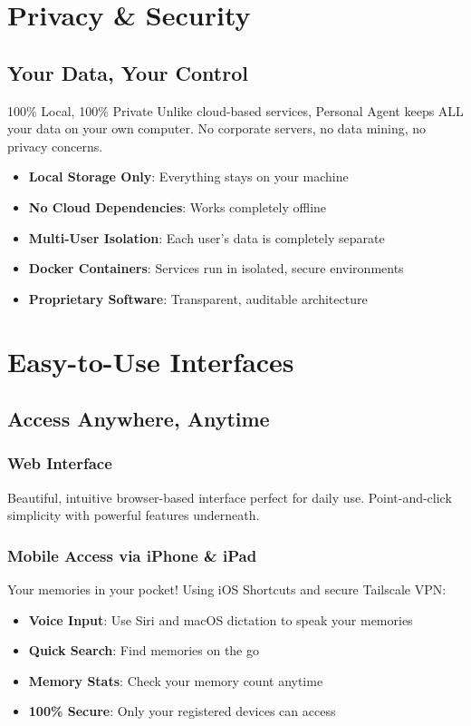 \documentclass[11pt,letterpaper]{article}
\begin{document}
\newpage
\section{Privacy \& Security}

\subsection{Your Data, Your Control}

\begin{featurebox}{{100\% Local, 100\% Private}}
Unlike cloud-based services, Personal Agent keeps ALL your data on your own computer. No corporate servers, no data mining, no privacy concerns.
\end{featurebox}

\begin{itemize}[leftmargin=*]
    \item \textbf{Local Storage Only}: Everything stays on your machine
    \item \textbf{No Cloud Dependencies}: Works completely offline
    \item \textbf{Multi-User Isolation}: Each user's data is completely separate
    \item \textbf{Docker Containers}: Services run in isolated, secure environments
    \item \textbf{Proprietary Software}: Transparent, auditable architecture
\end{itemize}

\newpage
\section{Easy-to-Use Interfaces}

\subsection{Access Anywhere, Anytime}

\subsubsection{Web Interface}
Beautiful, intuitive browser-based interface perfect for daily use. Point-and-click simplicity with powerful features underneath.

\subsubsection{Mobile Access via iPhone \& iPad}
Your memories in your pocket! Using iOS Shortcuts and secure Tailscale VPN:
\begin{itemize}[leftmargin=*]
    \item \textbf{Voice Input}: Use Siri and macOS dictation to speak your memories
    \item \textbf{Quick Search}: Find memories on the go
    \item \textbf{Memory Stats}: Check your memory count anytime
    \item \textbf{100\% Secure}: Only your registered devices can access
\end{itemize}
\end{document}
